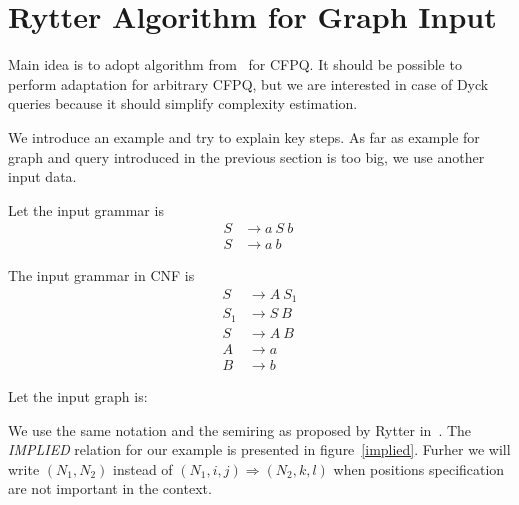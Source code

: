 \section {Rytter Algorithm for Graph Input} 

Main idea is to adopt algorithm from~\cite{Rytter} for CFPQ.
It should be possible to perform adaptation for arbitrary CFPQ, but we are interested in case of Dyck queries because it should simplify complexity estimation.

We introduce an example and try to explain key steps.
As far as example for graph and query introduced in the previous section is too big, we use another input data.

Let the input grammar is 
\begin{align*}
S & \rightarrow a \ S \ b \ 
\\
S & \rightarrow a \ b
\end{align*}

The input grammar in CNF is 
\begin{align*}
S   & \rightarrow A \ S_1
\\
S_1 & \rightarrow S \ B
\\
S   & \rightarrow A \ B
\\
A   & \rightarrow a
\\
B   & \rightarrow b
\end{align*}


Let the input graph is:
\\

  
We use the same notation and the semiring as proposed by Rytter in~\cite{Rytter}.
The \emph{IMPLIED} relation for our example is presented in figure~\ref{implied}.
Furher we will write $(N_1, N_2)$ instead of $(N_1,i,j) \Rightarrow (N_2,k,l)$ when positions specification are not important in the context.

